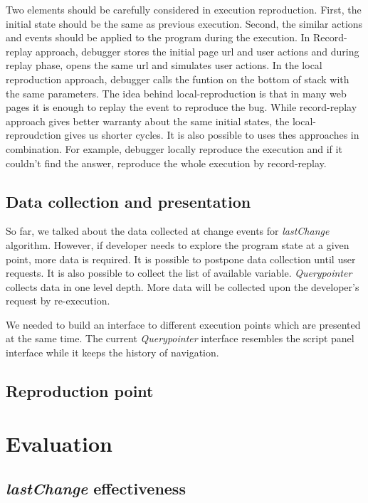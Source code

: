 \documentclass[preprint]{sigplanconf}
\begin{document}
Two elements should be carefully considered in execution
reproduction. First, the initial state should be the same as previous
execution. Second, the similar actions and events should be applied to
the program during the execution. In Record-replay approach, debugger
stores the initial page url and user actions and during replay phase,
opens the same url and simulates user actions. In the local
reproduction approach, debugger calls the funtion on the bottom of
stack with the same parameters. The idea behind local-reproduction is
that in many web pages it is enough to replay the event to reproduce
the bug. While record-replay approach gives better warranty about the
same initial states, the local-reproudction gives us shorter
cycles. It is also possible to uses thes approaches in
combination. For example, debugger locally reproduce the execution and
if it couldn't find the answer, reproduce the whole execution by
record-replay.

\subsection{Data collection and presentation}
So far, we talked about the data collected at change events for
\textit{lastChange} algorithm. However, if developer needs to explore
the program state at a given point, more data is required. It is
possible to postpone data collection until user requests. It is also
possible to collect the list of available
variable. \textit{Querypointer} collects data in one level depth. More
data will be collected upon the developer's request by re-execution.

We needed to build an interface to different execution points which
are presented at the same time. The current \textit{Querypointer}
interface resembles the script panel interface while it keeps the
history of navigation.

\subsection{Reproduction point}

\section{Evaluation}
\subsection{\textit{lastChange} effectiveness}
\end{document}
